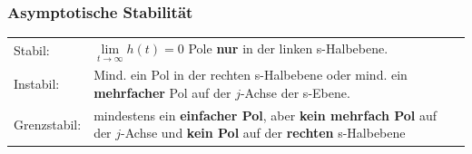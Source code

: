 \subsubsection{Asymptotische Stabilität }
\begin{tabular}{l p{15cm}}
Stabil: 
	& $\lim\limits_{t\rightarrow\infty} h(t) = 0$ 
	\qquad Pole \textbf{nur} in der
linken s-Halbebene.\\
Instabil: 
	& Mind. ein Pol in der rechten s-Halbebene oder mind. ein
\textbf{mehrfacher} Pol auf der $j$-Achse der s-Ebene. \\
Grenzstabil:
	& mindestens ein \textbf{einfacher Pol}, aber \textbf{kein mehrfach Pol} 
		auf der $j$-Achse und \textbf{kein Pol} auf der \textbf{rechten} s-Halbebene
\end{tabular}

\newpage

